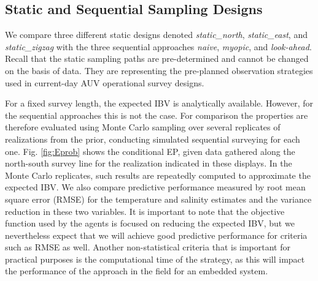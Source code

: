 \documentclass[aoas]{imsart}
\begin{document}
\subsection{Static and Sequential Sampling Designs}\label{sec:sampling_designs}


We compare three different static designs denoted
\textit{static\_north}, \textit{static\_east}, and
\textit{static\_zigzag} with the three sequential approaches
\textit{naive}, \textit{myopic}, and \textit{look-ahead}. Recall that the static
sampling paths are pre-determined and cannot be changed on the basis
of data. They are representing the pre-planned observation
strategies used in current-day AUV operational survey designs.

For a fixed survey length, the expected IBV is analytically available. However, for the sequential approaches this is not the case. For comparison the properties are therefore evaluated using Monte Carlo sampling over several replicates of realizations from the prior, conducting simulated sequential surveying for each one. Fig. \ref{fig:Eprob} shows the conditional EP, given data gathered along the north-south survey line for the realization indicated in these displays. In the Monte Carlo replicates, such results are repeatedly computed to approximate the expected IBV. We also compare predictive performance measured by root mean square error (RMSE) for the temperature and salinity estimates and the variance reduction in these two variables. It is important to note that the objective function used by the agents is focused on reducing the expected IBV, but we nevertheless expect that we will achieve good predictive performance for criteria such as RMSE as well. Another non-statistical criteria that is important for practical purposes is the computational time of the strategy, as this will impact the performance of the approach in the field for an embedded system. 
\end{document}
